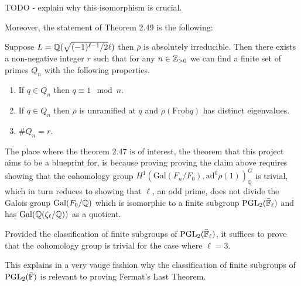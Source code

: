 TODO - explain why this isomorphism is crucial.

Moreover, the statement of Theorem 2.49 is the following:

\begin{theorem}[Theorem 2.49]
    Suppose $L = \mathbb{Q}(\sqrt{(-1)^{\ell -1}/2} \ell)$ then $\bar{\rho}$ is absolutely irreducible. Then
    there exists a non-negative integer $r$ such that for any $n \in \mathbb{Z}_{>0}$ we can find a
    finite set of primes $Q_n$ with the following properties.
    \begin{enumerate}
        \item If $q \in Q_n$ then $q \equiv 1 \mod n$.
        \item If $q \in Q_n$ then $\bar{\rho}$ is unramified at $q$ and $\rho(\textrm{Frob}q)$ has distinct eigenvalues.
        \item $\# Q_n = r$.
    \end{enumerate}
\end{theorem}

The place where the theorem 2.47 is of interest, the theorem that this project aims to be a blueprint for, is because proving proving the claim above requires showing that the 
cohomology group  $H^1(\textrm{Gal}(F_n / F_0), \textrm{ad}^0\bar{\rho}(1))^G_{\mathbb{Q}}$ is trivial, which in turn reduces to showing that $\ell$, an odd prime, does not divide the Galois group $\operatorname{Gal}(F_0 /\mathbb{Q})$ which is isomorphic to a finite subgroup $\operatorname{PGL}_2(\bar{\mathbb{F}}_\ell)$
and has $\operatorname{Gal}(\mathbb{Q}(\zeta_\ell/\mathbb{Q}))$ as a quotient.

Provided the classification of finite subgroups of $\operatorname{PGL}_2(\bar{\mathbb{F}}_\ell)$, it suffices to prove that the cohomology group is trivial for the case where $\ell = 3$.

This explains in a very vauge fashion why the classification of finite subgroups of $\operatorname{PGL}_2(\bar{\mathbb{F}})$ is relevant to proving Fermat's Last Theorem.





